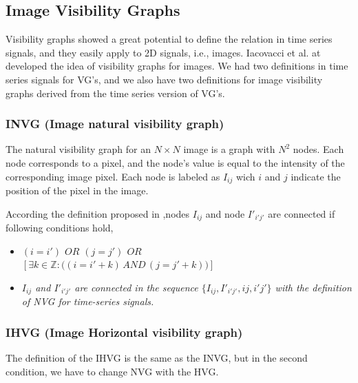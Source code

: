 \documentclass[conference]{IEEEtran}
\newcommand\tab[1][1cm]{\hspace*{#1}}
\begin{document}
\subsection{\textbf{Image Visibility Graphs}}
Visibility graphs showed a great potential to define the relation in time series signals, and they easily apply to 2D signals, i.e., images. Iacovacci et al. at \cite{IVG} developed the idea of visibility graphs for images. We had two definitions in time series signals for VG's, and we also have two definitions for image visibility graphs derived from the time series version of VG's.

\subsubsection{\textbf{INVG} (Image natural visibility graph)}
The natural visibility graph for an $N\times N$ image is a graph with $N^2$ nodes. Each node corresponds to a pixel, and the node's value is equal to the intensity of the corresponding image pixel. Each node is labeled as $I_{ij}$ wich $i$ and $j$ indicate the position of the pixel in the image.

According the definition proposed in \cite{IVG},nodes $I_{ij}$ and node $I'_{i'j'}$ are connected if following conditions hold,

\vspace{0.5cm}
\begin{itemize}
\setlength{\itemindent}{.5cm}
\item \emph{$(i=i')$ $OR$ $(j=j')$ $OR$ \\
\tab $ [\exists k \in \mathbb{Z} : \big((i=i'+k)\, AND \, (j=j'+k)\big)]$} 
\vspace{0.1cm}
\item \emph{$I_{ij}$ and $I'_{i'j'}$ are connected in the sequence \tab $\big\{I_{ij},I'_{i'j'},ij, i'j'\big\}$ 
 with the definition of NVG for \tab time-series signals.}
\end{itemize}
\vspace{0.5cm}



\subsubsection{\textbf{IHVG} (Image Horizontal visibility graph)}
The definition of the IHVG is the same as the INVG, but in the second condition, we have to change NVG with the HVG.
\end{document}
